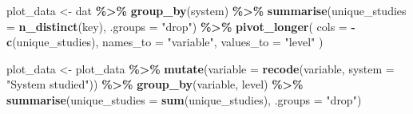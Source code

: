 \documentclass[
]{article}
\newenvironment{Shaded}{\begin{snugshade}}{\end{snugshade}}
\newcommand{\AttributeTok}[1]{\textcolor[rgb]{0.13,0.29,0.53}{#1}}
\newcommand{\FunctionTok}[1]{\textcolor[rgb]{0.13,0.29,0.53}{\textbf{#1}}}
\newcommand{\NormalTok}[1]{#1}
\newcommand{\OtherTok}[1]{\textcolor[rgb]{0.56,0.35,0.01}{#1}}
\newcommand{\SpecialCharTok}[1]{\textcolor[rgb]{0.81,0.36,0.00}{\textbf{#1}}}
\newcommand{\StringTok}[1]{\textcolor[rgb]{0.31,0.60,0.02}{#1}}
\begin{document}
\begin{Shaded}
\begin{Highlighting}[]
\NormalTok{plot\_data }\OtherTok{\textless{}{-}}\NormalTok{ dat }\SpecialCharTok{\%\textgreater{}\%}
  \FunctionTok{group\_by}\NormalTok{(system) }\SpecialCharTok{\%\textgreater{}\%}
  \FunctionTok{summarise}\NormalTok{(}\AttributeTok{unique\_studies =} \FunctionTok{n\_distinct}\NormalTok{(key), }\AttributeTok{.groups =} \StringTok{"drop"}\NormalTok{) }\SpecialCharTok{\%\textgreater{}\%}
  \FunctionTok{pivot\_longer}\NormalTok{(}
    \AttributeTok{cols =} \SpecialCharTok{{-}}\FunctionTok{c}\NormalTok{(unique\_studies),}
    \AttributeTok{names\_to =} \StringTok{"variable"}\NormalTok{,}
    \AttributeTok{values\_to =} \StringTok{"level"}
\NormalTok{)}

\NormalTok{plot\_data }\OtherTok{\textless{}{-}}\NormalTok{ plot\_data }\SpecialCharTok{\%\textgreater{}\%}
  \FunctionTok{mutate}\NormalTok{(}\AttributeTok{variable =} \FunctionTok{recode}\NormalTok{(variable,}
                           \AttributeTok{system =} \StringTok{"System studied"}\NormalTok{)) }\SpecialCharTok{\%\textgreater{}\%}
  \FunctionTok{group\_by}\NormalTok{(variable, level) }\SpecialCharTok{\%\textgreater{}\%}
  \FunctionTok{summarise}\NormalTok{(}\AttributeTok{unique\_studies =} \FunctionTok{sum}\NormalTok{(unique\_studies), }\AttributeTok{.groups =} \StringTok{"drop"}\NormalTok{)}


\end{Highlighting}
\end{Shaded}
\end{document}
